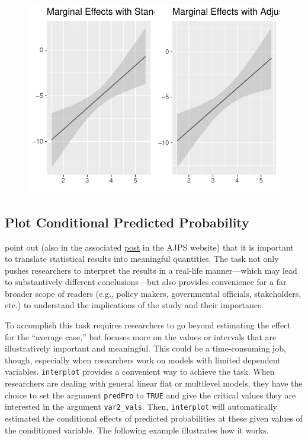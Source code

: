 \documentclass[
  article]{jss}
\begin{document}
\begin{figure}[H]

{\centering \includegraphics{jss_manuscript_files/figure-pdf/unnamed-chunk-17-1.pdf}

}

\end{figure}

\hypertarget{plot-conditional-predicted-probability}{%
\subsection{Plot Conditional Predicted
Probability}\label{plot-conditional-predicted-probability}}

\citep{HanmerOzanKalkan2013} point out (also in the associated
\href{https://ajps.org/2014/11/13/translating-statistical-results-into-meaningful-quantities-methods/}{post}
in the AJPS website) that it is important to translate statistical
results into meaningful quantities. The task not only pushes researchers
to interpret the results in a real-life manner---which may lead to
substantively different conclusions---but also provides convenience for
a far broader scope of readers (e.g., policy makers, governmental
officials, stakeholders, etc.) to understand the implications of the
study and their importance.

To accomplish this task requires researchers to go beyond estimating the
effect for the ``average case,'' but focuses more on the values or
intervals that are illustratively important and meaningful. This could
be a time-consuming job, though, especially when researchers work on
models with limited dependent variables. \texttt{interplot} provides a
convenient way to achieve the task. When researchers are dealing with
general linear flat or multilevel models, they have the choice to set
the argument \texttt{predPro} to \texttt{TRUE} and give the critical
values they are interested in the argument \texttt{var2\_vals}. Then,
\texttt{interplot} will automatically estimated the conditional effects
of predicted probabilities at these given values of the conditioned
variable. The following example illustrates how it works.
\end{document}
